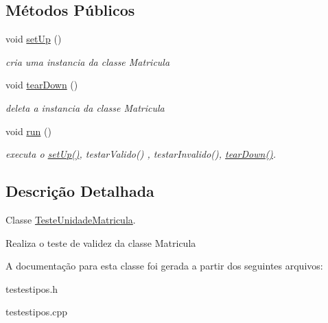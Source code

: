 \subsection*{\-Métodos \-Públicos}
\begin{DoxyCompactItemize}
\item 
\hypertarget{class_teste_unidade_matricula_aa5289b85d9097a5cd776889066a2a21e}{
void \hyperlink{class_teste_unidade_matricula_aa5289b85d9097a5cd776889066a2a21e}{set\-Up} ()}
\label{class_teste_unidade_matricula_aa5289b85d9097a5cd776889066a2a21e}

\begin{DoxyCompactList}\small\item\em cria uma instancia da classe \-Matricula \end{DoxyCompactList}\item 
\hypertarget{class_teste_unidade_matricula_acd40e1914bdfb2eaddc1e24dcda6a92d}{
void \hyperlink{class_teste_unidade_matricula_acd40e1914bdfb2eaddc1e24dcda6a92d}{tear\-Down} ()}
\label{class_teste_unidade_matricula_acd40e1914bdfb2eaddc1e24dcda6a92d}

\begin{DoxyCompactList}\small\item\em deleta a instancia da classe \-Matricula \end{DoxyCompactList}\item 
\hypertarget{class_teste_unidade_matricula_af9494e1ba911d9f8a84df252057f4fd7}{
void \hyperlink{class_teste_unidade_matricula_af9494e1ba911d9f8a84df252057f4fd7}{run} ()}
\label{class_teste_unidade_matricula_af9494e1ba911d9f8a84df252057f4fd7}

\begin{DoxyCompactList}\small\item\em executa o \hyperlink{class_teste_unidade_matricula_aa5289b85d9097a5cd776889066a2a21e}{set\-Up()}, testar\-Valido() , testar\-Invalido(), \hyperlink{class_teste_unidade_matricula_acd40e1914bdfb2eaddc1e24dcda6a92d}{tear\-Down()}. \end{DoxyCompactList}\end{DoxyCompactItemize}


\subsection{\-Descrição \-Detalhada}
\-Classe \hyperlink{class_teste_unidade_matricula}{\-Teste\-Unidade\-Matricula}. 

\-Realiza o teste de validez da classe \-Matricula 

\-A documentação para esta classe foi gerada a partir dos seguintes arquivos\-:\begin{DoxyCompactItemize}
\item 
testestipos.\-h\item 
testestipos.\-cpp\end{DoxyCompactItemize}
